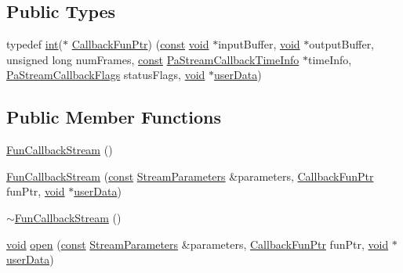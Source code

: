\subsection*{Public Types}
\begin{DoxyCompactItemize}
\item 
typedef \hyperlink{xmltok_8h_a5a0d4a5641ce434f1d23533f2b2e6653}{int}($\ast$ \hyperlink{classportaudio_1_1_fun_callback_stream_abad4a65493bda517c7df8d7cee847784}{Callback\+Fun\+Ptr}) (\hyperlink{getopt1_8c_a2c212835823e3c54a8ab6d95c652660e}{const} \hyperlink{sound_8c_ae35f5844602719cf66324f4de2a658b3}{void} $\ast$input\+Buffer, \hyperlink{sound_8c_ae35f5844602719cf66324f4de2a658b3}{void} $\ast$output\+Buffer, unsigned long num\+Frames, \hyperlink{getopt1_8c_a2c212835823e3c54a8ab6d95c652660e}{const} \hyperlink{struct_pa_stream_callback_time_info}{Pa\+Stream\+Callback\+Time\+Info} $\ast$time\+Info, \hyperlink{portaudio_8h_a55a005924bcfa0424594f4f65cd4ae82}{Pa\+Stream\+Callback\+Flags} status\+Flags, \hyperlink{sound_8c_ae35f5844602719cf66324f4de2a658b3}{void} $\ast$\hyperlink{xmlparse_8c_a4b666535c828e23ccd16510a0a1a1943}{user\+Data})
\end{DoxyCompactItemize}
\subsection*{Public Member Functions}
\begin{DoxyCompactItemize}
\item 
\hyperlink{classportaudio_1_1_fun_callback_stream_adf0494487368766b3d804e99d385d0b7}{Fun\+Callback\+Stream} ()
\item 
\hyperlink{classportaudio_1_1_fun_callback_stream_ab33ceb9f2d1653242b99eebb2e0b5946}{Fun\+Callback\+Stream} (\hyperlink{getopt1_8c_a2c212835823e3c54a8ab6d95c652660e}{const} \hyperlink{classportaudio_1_1_stream_parameters}{Stream\+Parameters} \&parameters, \hyperlink{classportaudio_1_1_fun_callback_stream_abad4a65493bda517c7df8d7cee847784}{Callback\+Fun\+Ptr} fun\+Ptr, \hyperlink{sound_8c_ae35f5844602719cf66324f4de2a658b3}{void} $\ast$\hyperlink{xmlparse_8c_a4b666535c828e23ccd16510a0a1a1943}{user\+Data})
\item 
\hyperlink{classportaudio_1_1_fun_callback_stream_ac980ec68b89f1b1d78e8d03db4e82a53}{$\sim$\+Fun\+Callback\+Stream} ()
\item 
\hyperlink{sound_8c_ae35f5844602719cf66324f4de2a658b3}{void} \hyperlink{classportaudio_1_1_fun_callback_stream_a765d0c213f318c76b69fb72a1b10e3d2}{open} (\hyperlink{getopt1_8c_a2c212835823e3c54a8ab6d95c652660e}{const} \hyperlink{classportaudio_1_1_stream_parameters}{Stream\+Parameters} \&parameters, \hyperlink{classportaudio_1_1_fun_callback_stream_abad4a65493bda517c7df8d7cee847784}{Callback\+Fun\+Ptr} fun\+Ptr, \hyperlink{sound_8c_ae35f5844602719cf66324f4de2a658b3}{void} $\ast$\hyperlink{xmlparse_8c_a4b666535c828e23ccd16510a0a1a1943}{user\+Data})
\end{DoxyCompactItemize}
